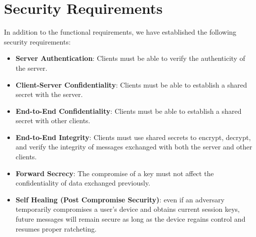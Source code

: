 \section{Security Requirements}
\label{sec:SecRequirements}

In addition to the functional requirements, we have established the following security requirements:
\begin{itemize}
    \item \textbf{Server Authentication}: Clients must be able to verify the authenticity of the server.
    \item \textbf{Client-Server Confidentiality}: Clients must be able to establish a shared secret with the server.
    \item \textbf{End-to-End Confidentiality}: Clients must be able to establish a shared secret with other clients.
    \item \textbf{End-to-End Integrity}: Clients must use shared secrets to encrypt, decrypt, and verify the integrity of messages exchanged with both the server and other clients.
    \item \textbf{Forward Secrecy}: The compromise of a key must not affect the confidentiality of data exchanged previously.
    \item\textbf{Self Healing (Post Compromise Security)}: even if an adversary temporarily compromises a user's device and obtains current session keys, future messages will remain secure as long as the device regains control and resumes proper ratcheting.
\end{itemize}
